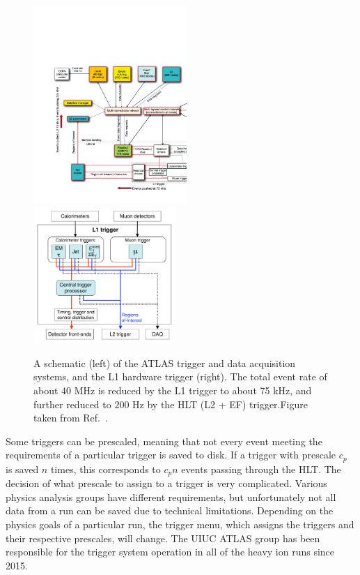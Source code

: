 \begin{figure}[t]
	\centerline{
		\includegraphics[width=0.52\textwidth]{figures/trig_daq.pdf} %
		\includegraphics[width=0.48\textwidth]{figures/trig_l1.pdf} %
	}
	\caption{ A schematic (left) of the ATLAS trigger and data acquisition systems, and the L1 hardware trigger (right). The total event rate of about 40 MHz is reduced by the L1 trigger to about 75 kHz, and further reduced to 200 Hz by the HLT (L2 + EF) trigger.Figure taken from Ref.~\cite{Aad:2008zzm}.}	
	\label{fig:trigdaq}
\end{figure}

Some triggers can be prescaled, meaning that not every event meeting the requirements of a particular trigger is saved to disk. If a trigger with prescale $c_{p}$ is saved $n$ times, this corresponds to $c_{p}n$ events passing through the HLT. The decision of what prescale to assign to a trigger is very complicated. Various physics analysis groups have different requirements, but unfortunately not all data from a run can be saved due to technical limitations. Depending on the physics goals of a particular run, the trigger menu, which assigns the triggers and their respective prescales, will change. The UIUC ATLAS group has been responsible for the trigger system operation in all of the heavy ion runs since 2015.


